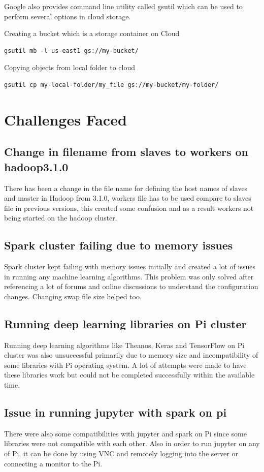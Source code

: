 Google also provides command line utility called gsutil which can be used to perform several options in cloud storage.

Creating a bucket which is a storage container on Cloud

\begin{verbatim}
gsutil mb -l us-east1 gs://my-bucket/
\end{verbatim}

Copying objects from local folder to cloud

\begin{verbatim}
gsutil cp my-local-folder/my_file gs://my-bucket/my-folder/
\end{verbatim}

\section{Challenges Faced}


\subsection{Change in filename from slaves to workers on hadoop3.1.0}
There has been a change in the file name for defining the host names of slaves and master in Hadoop from 3.1.0, workers file has to be used compare to slaves file in previous versions, this created some confusion and as a result workers not being started on the hadoop cluster.
\subsection{Spark cluster failing due to memory issues}
Spark cluster kept failing with memory issues initially and created a lot of issues in running any machine learning algorithms. This problem was only solved after referencing a lot of forums and online discussions to understand the configuration changes. Changing swap file size helped too.
\subsection{Running deep learning libraries on Pi cluster}
Running deep learning algorithms like Theanos, Keras and TensorFlow on Pi cluster was also unsuccessful primarily due to memory size and incompatibility of some libraries with Pi operating system. A lot of attempts were made to have these libraries work but could not be completed successfully within the available time.
\subsection{Issue in running jupyter with spark on pi}
There were also some compatibilities with jupyter and spark on Pi since some libraries were not compatible with each other. Also in order to run jupyter on any of Pi, it can be done by using VNC and remotely logging into the server or connecting a monitor to the Pi.
